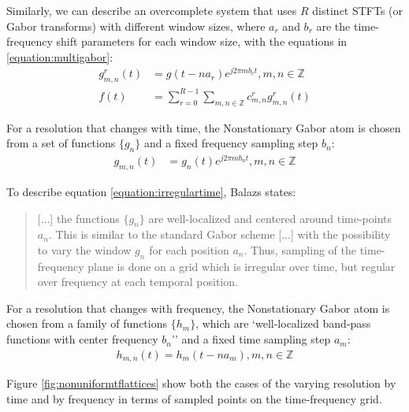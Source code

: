 \documentclass[report.tex]{subfiles}
\begin{document}
Similarly, we can describe an overcomplete system that uses $R$ distinct STFTs (or Gabor transforms) with different window sizes, where $a_{r}$ and $b_{r}$ are the time-frequency shift parameters for each window size, with the equations in \ref{equation:multigabor}:
\begin{align}
	\nonumber g_{m,n}^{r}(t) &= g(t - na_{r})e^{j2\pi m b_{r} t}, m,n \in \mathbb{Z}\\
	\nonumber f(t) &= \sum_{r=0}^{R-1}\sum_{m,n \in \mathbb{Z}}c^{r}_{m,n}g^{r}_{m,n}(t) \tag{13}\label{equation:multigabor}
\end{align}

For a resolution that changes with time, the Nonstationary Gabor atom is chosen from a set of functions $\{g_{n}\}$ and a fixed frequency sampling step $b_{n}$:
\begin{align}\tag{14}\label{equation:irregulartime}
	g_{m,n}(t) &= g_{n}(t)e^{j2\pi m b_{n}t}, m,n \in \mathbb{Z}
\end{align}

To describe equation \ref{equation:irregulartime}, Balazs states:

\begin{quote}
		[...] the functions $\{g_{n}\}$ are well-localized and centered around time-points $a_{n}$. This is similar to the standard Gabor scheme [...] with the possibility to vary the window $g_{n}$ for each position $a_{n}$. Thus, sampling of the time-frequency plane is done on a grid which is irregular over time, but regular over frequency at each temporal position.
\end{quote}

For a resolution that changes with frequency, the Nonstationary Gabor atom is chosen from a family of functions $\{h_{m}\}$, which are `well-localized band-pass functions with center frequency $b_{n}$'' and a fixed time sampling step $a_{m}$:
\begin{align}\tag{15}\label{equation:irregularfrequency}
	h_{m,n}(t) = h_{m}(t - na_{m}), m,n \in \mathbb{Z}
\end{align}

Figure \ref{fig:nonuniformtflattices} show both the cases of the varying resolution by time and by frequency in terms of sampled points on the time-frequency grid.
\end{document}
